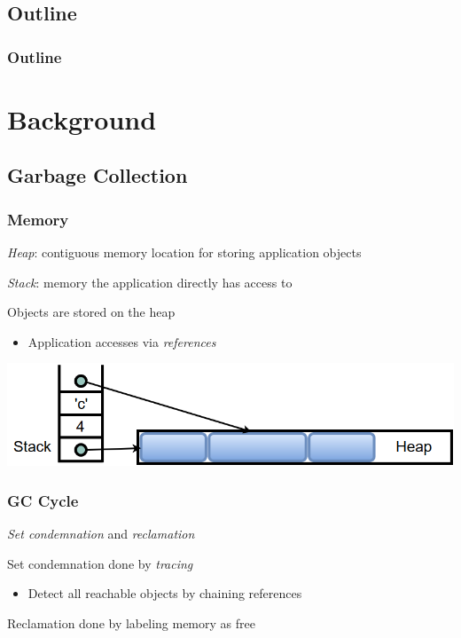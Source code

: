 \documentclass{beamer}
\newcommand{\linespace}{\vskip 0.25cm}
\begin{document}
\subsection*{Outline}

\begin{frame}
  \frametitle{Outline}
  \tableofcontents  
\end{frame}



\section[Background]{Background}

\subsection[GC Basics]{Garbage Collection}

\begin{frame}

\frametitle{Memory}

\emph{Heap}: contiguous memory location for storing application objects

\linespace
\linespace

\emph{Stack}: memory the application directly has access to

\linespace
\linespace

Objects are stored on the heap
\begin{itemize}
\item Application accesses via \emph{references}
\end{itemize}

\linespace
\linespace

\begin{center}
\includegraphics[width=.8\textwidth]{Illustrations/stack_and_heap.png}
\end{center}

\end{frame}

\begin{frame}

\frametitle{GC Cycle}

\emph{Set condemnation} and \emph{reclamation}

\linespace
\linespace

Set condemnation done by \emph{tracing}
\begin{itemize}
\item Detect all reachable objects by chaining references
\end{itemize}

\linespace
\linespace

Reclamation done by labeling memory as free

\end{frame}
\end{document}
